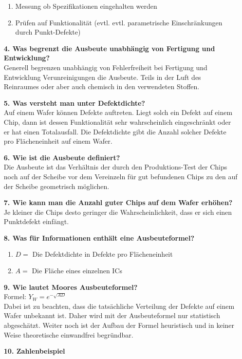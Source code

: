 \documentclass[a4paper,10pt,headsepline, DIV11]{scrartcl}%
\begin{document}
\begin{itemize}
\begin{enumerate}
			\item Messung ob Spezifikationen eingehalten werden
			\item Prüfen auf Funktionalität (evtl. evtl. parametrische Einschränkungen durch Punkt-Defekte)
		\end{enumerate}
		\item[\textbf{4. Was begrenzt die Ausbeute unabhängig von Fertigung und Entwicklung?}]\hfill \\
		Generell begrenzen unabhängig von Fehlerfreiheit bei Fertigung und Entwicklung Verunreinigungen die Ausbeute. Teils in der Luft des Reinraumes oder aber auch chemisch in den verwendeten Stoffen.
		\item[\textbf{5. Was versteht man unter Defektdichte?}]\hfill \\
		Auf einem Wafer können Defekte auftreten. Liegt solch ein Defekt auf einem Chip, dann ist dessen Funktionalität sehr wahrscheinlich eingeschränkt oder er hat einen Totalausfall. Die Defektdichte gibt die Anzahl solcher Defekte pro Flächeneinheit auf einem Wafer.
		\item[\textbf{6. Wie ist die Ausbeute definiert?}]\hfill \\
		Die Ausbeute ist das Verhältnis der durch den Produktions-Test der Chips noch auf der Scheibe vor dem Vereinzeln für gut befundenen Chips zu den auf der Scheibe geometrisch möglichen.
		\item[\textbf{7. Wie kann man die Anzahl guter Chips auf dem Wafer erhöhen?}]\hfill \\
		Je kleiner die Chips desto geringer die Wahrscheinlichkeit, dass er sich einen Punktdefekt einfängt.
		\item[\textbf{8. Was für Informationen enthält eine Ausbeuteformel?}]\hfill
		\begin{enumerate}
			\item $D =$ Die Defektdichte in Defekte pro Flächeneinheit
			\item $A =$ Die Fläche eines einzelnen ICs
		\end{enumerate}
	\item[\textbf{9. Wie lautet Moores Ausbeuteformel?}]\hfill \\
	Formel: $Y_W = e^{-\sqrt{AD}}$\\
	Dabei ist zu beachten, dass die tatsächliche Verteilung der Defekte auf einem Wafer unbekannt ist. Daher wird mit der Ausbeuteformel nur statistisch abgeschätzt. Weiter noch ist der Aufbau der Formel heuristisch und in keiner Weise theoretische einwandfrei begründbar.
	\item[\textbf{10. Zahlenbeispiel}]\hfill

\end{itemize}
\end{document}
